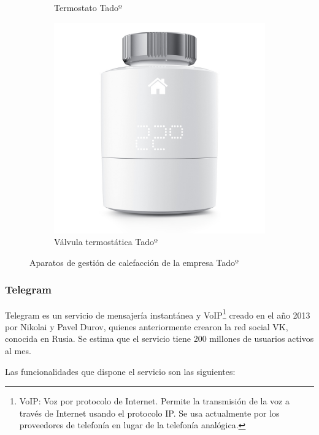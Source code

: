 \documentclass[spanish,12pt, a4paper, twoside]{paper}
\begin{document}
\begin{figure}[htp]
\begin{subfigure}{0.5\textwidth}
\caption{Termostato Tadoº}
\label{fig:termostato tado}
\end{subfigure}
\begin{subfigure}{0.5\textwidth}
\includegraphics[width=\textwidth]{recursos/valvula.jpeg}
\caption{Válvula termostática Tadoº}
\label{fig:valvula tado}
\end{subfigure}

\caption{Aparatos de gestión de calefacción de la empresa Tadoº}
\label{fig:aparatos tado}
\end{figure}

\subsubsection{Telegram}

Telegram es un servicio de mensajería instantánea y VoIP\footnote{VoIP: Voz por protocolo de Internet. Permite la transmisión de la voz a través de Internet usando el protocolo IP. Se usa actualmente por los proveedores de telefonía en lugar de la telefonía analógica.} creado en el año 2013 por Nikolai y Pavel Durov, quienes anteriormente crearon la red social VK, conocida en Rusia. Se estima que el servicio tiene 200 millones de usuarios activos al mes.

Las funcionalidades que dispone el servicio son las siguientes:
\end{document}
